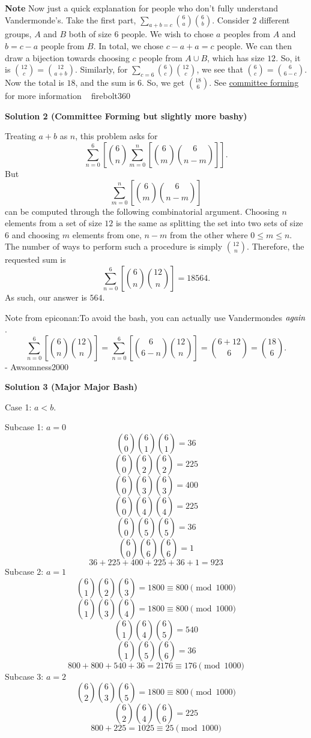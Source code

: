 \begin{enumerate}
 \textbf{Note} Now just a quick explanation for people who don't fully understand Vandermonde's. Take the first part, $\sum_{a+b=c} \binom{6}{a}\binom{6}{b}$. Consider $2$ different groups, $A$ and $B$ both of size $6$ people. We wish to chose $a$ peoples from $A$ and $b=c-a$ people from $B$. In total, we chose $c-a+a=c$ people. We can then draw a bijection towards choosing $c$ people from $A\cup B$, which has size $12$. So, it is $\binom{12}{c}=\binom{12}{a+b}$. Similarly, for $\sum_{c=6} \binom{6}{c}\binom{12}{c}$, we see that $\binom{6}{c}=\binom{6}{6-c}$. Now the total is $18$, and the sum is $6$. So, we get $\binom{18}{6}$. See \href{https://artofproblemsolving.com/wiki/index.php?title=Committee\_forming}{committee forming} for more information ~ firebolt360

 



\textbf{Solution 2 (Committee Forming but slightly more bashy)}

Treating $a+b$ as $n$, this problem asks for 
 \[\sum_{n=0}^{6} \left[\binom{6}{n}\sum_{m=0}^{n}\left[\binom{6}{m}\binom{6}{n-m}\right]\right].\] But 
 \[\sum_{m=0}^{n} \left[\binom{6}{m} \binom{6}{n-m}\right]\]can be computed through the following combinatorial argument.  Choosing $n$ elements from a set of size $12$ is the same as splitting the set into two sets of size $6$ and choosing $m$ elements from one, $n-m$ from the other where $0\leq m\leq n$.  The number of ways to perform such a procedure is simply $\binom{12}{n}$. Therefore, the requested sum is 
 \[\sum_{n=0}^{6} \left[\binom{6}{n} \binom{12}{n}\right] = 18564.\] As such, our answer is $\boxed{564}$.

 Note from epiconan:To avoid the bash, you can actually use Vandermondes $\emph{again}$.
 \[\sum_{n=0}^{6} \left[\binom{6}{n} \binom{12}{n}\right] = \sum_{n=0}^{6} \left[\binom{6}{6-n} \binom{12}{n}\right] = \binom{6+12}{6} = \binom{18}{6}.\]- Awsomness2000

 



\textbf{Solution 3 (Major Major Bash)}

Case 1: $a<b$.

 Subcase 1: $a=0$
 \[\binom{6}{0}\binom{6}{1}\binom{6}{1}=36\]
 \[\binom{6}{0}\binom{6}{2}\binom{6}{2}=225\]
 \[\binom{6}{0}\binom{6}{3}\binom{6}{3}=400\]
 \[\binom{6}{0}\binom{6}{4}\binom{6}{4}=225\]
 \[\binom{6}{0}\binom{6}{5}\binom{6}{5}=36\]
 \[\binom{6}{0}\binom{6}{6}\binom{6}{6}=1\]
 \[36+225+400+225+36+1=923\]Subcase 2: $a=1$
 \[\binom{6}{1}\binom{6}{2}\binom{6}{3}=1800 \equiv 800 \pmod {1000}\]
 \[\binom{6}{1}\binom{6}{3}\binom{6}{4}=1800 \equiv 800 \pmod {1000}\]
 \[\binom{6}{1}\binom{6}{4}\binom{6}{5}=540\]
 \[\binom{6}{1}\binom{6}{5}\binom{6}{6}=36\]
 \[800+800+540+36=2176 \equiv 176 \pmod {1000}\]Subcase 3: $a=2$
 \[\binom{6}{2}\binom{6}{3}\binom{6}{5}=1800\equiv800\pmod{1000}\]
 \[\binom{6}{2}\binom{6}{4}\binom{6}{6}=225\]
 \[800+225=1025\equiv25\pmod{1000}\]


\end{enumerate}
